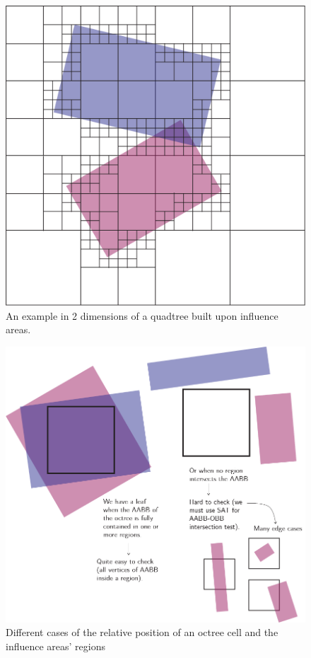 \documentclass{PoliMi_MasterThesis}
\begin{document}
\begin{figure}[H]
	\centering
	\includegraphics[width=\textwidth*\real{0.5}]{Images/octree_for_influence_areas.png}
	\caption{An example in 2 dimensions of a quadtree built upon influence areas.} 
	\label{fig:octree_for_influence_areas}
\end{figure}

\begin{figure}[H]
	\centering
	\includegraphics[width=\textwidth*\real{0.8}]{Images/octree_detect_leaf.png}
	\caption{Different cases of the relative position of an octree cell and the influence areas' regions}
	\label{fig:octree_detect_leaf}
\end{figure}
\end{document}
